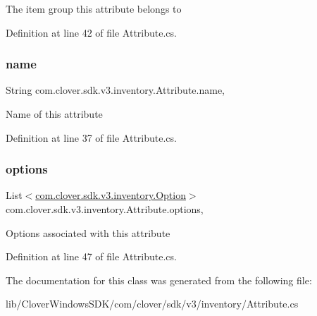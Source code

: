 The item group this attribute belongs to 



Definition at line 42 of file Attribute.\+cs.

\mbox{\label{classcom_1_1clover_1_1sdk_1_1v3_1_1inventory_1_1_attribute_ae5418007d896bd23042093e67cc1c2d9}} 
\subsubsection{\texorpdfstring{name}{name}}
{\footnotesize\ttfamily String com.\+clover.\+sdk.\+v3.\+inventory.\+Attribute.\+name\hspace{0.3cm}{\ttfamily [get]}, {\ttfamily [set]}}



Name of this attribute 



Definition at line 37 of file Attribute.\+cs.

\mbox{\label{classcom_1_1clover_1_1sdk_1_1v3_1_1inventory_1_1_attribute_a1d428824d832818f79da2c6695c732a2}} 
\subsubsection{\texorpdfstring{options}{options}}
{\footnotesize\ttfamily List$<$\hyperlink{classcom_1_1clover_1_1sdk_1_1v3_1_1inventory_1_1_option}{com.\+clover.\+sdk.\+v3.\+inventory.\+Option}$>$ com.\+clover.\+sdk.\+v3.\+inventory.\+Attribute.\+options\hspace{0.3cm}{\ttfamily [get]}, {\ttfamily [set]}}



Options associated with this attribute 



Definition at line 47 of file Attribute.\+cs.



The documentation for this class was generated from the following file\+:\begin{DoxyCompactItemize}
\item 
lib/\+Clover\+Windows\+S\+D\+K/com/clover/sdk/v3/inventory/Attribute.\+cs\end{DoxyCompactItemize}

